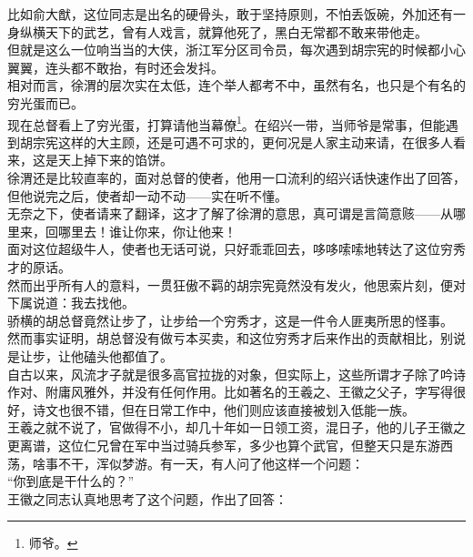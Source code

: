 \begin{multicols}{\theparacolNo}
比如俞大猷，这位同志是出名的硬骨头，敢于坚持原则，不怕丢饭碗，外加还有一身纵横天下的武艺，曾有人戏言，就算他死了，黑白无常都不敢来带他走。\\

但就是这么一位响当当的大侠，浙江军分区司令员，每次遇到胡宗宪的时候都小心翼翼，连头都不敢抬，有时还会发抖。\\

相对而言，徐渭的层次实在太低，连个举人都考不中，虽然有名，也只是个有名的穷光蛋而已。\\

现在总督看上了穷光蛋，打算请他当幕僚\footnote{师爷。}。在绍兴一带，当师爷是常事，但能遇到胡宗宪这样的大主顾，还是可遇不可求的，更何况是人家主动来请，在很多人看来，这是天上掉下来的馅饼。\\

徐渭还是比较直率的，面对总督的使者，他用一口流利的绍兴话快速作出了回答，但他说完之后，使者却一动不动——实在听不懂。\\

无奈之下，使者请来了翻译，这才了解了徐渭的意思，真可谓是言简意赅——从哪里来，回哪里去！谁让你来，你让他来！\\

面对这位超级牛人，使者也无话可说，只好乖乖回去，哆哆嗦嗦地转达了这位穷秀才的原话。\\

然而出乎所有人的意料，一贯狂傲不羁的胡宗宪竟然没有发火，他思索片刻，便对下属说道：我去找他。\\

骄横的胡总督竟然让步了，让步给一个穷秀才，这是一件令人匪夷所思的怪事。\\

然而事实证明，胡总督没有做亏本买卖，和这位穷秀才后来作出的贡献相比，别说是让步，让他磕头他都值了。\\

自古以来，风流才子就是很多高官拉拢的对象，但实际上，这些所谓才子除了吟诗作对、附庸风雅外，并没有任何作用。比如著名的王羲之、王徽之父子，字写得很好，诗文也很不错，但在日常工作中，他们则应该直接被划入低能一族。\\

王羲之就不说了，官做得不小，却几十年如一日领工资，混日子，他的儿子王徽之更离谱，这位仁兄曾在军中当过骑兵参军，多少也算个武官，但整天只是东游西荡，啥事不干，浑似梦游。有一天，有人问了他这样一个问题：\\

“你到底是干什么的？”\\

王徽之同志认真地思考了这个问题，作出了回答：\\


\end{multicols}
